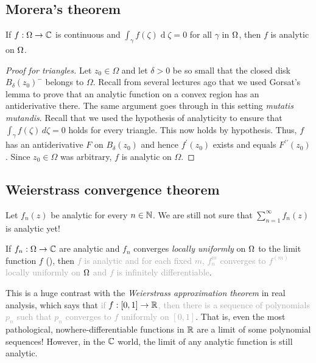 \documentclass[12pt]{article}
\renewcommand{\d}{\ensuremath{\operatorname{d}}}
\begin{document}
\subsection{Morera's theorem}
\begin{theorem}[Morera]
    If $f:\Omega\to\mathbb{C}$ is continuous and $\int_{\gamma}f(\zeta)\d\zeta=0$ for all \underline{\hspace{2cm}} $\gamma$ in $\Omega$, then $f$ is analytic on $\Omega$. 
\end{theorem}
\begin{proof}[Proof for triangles]
    Let $z_{0}\in\Omega$ and let $\delta>0$ be so small that the closed disk $B_{\delta}(z_{0})^{-}$ belongs to $\Omega$. Recall from several lectures ago that we used Gorsat's lemma to prove that an analytic function on a convex region has an antiderivative there. The same argument goes through in this setting \textit{mutatis mutandis}. Recall that we used the hypothesis of analyticity to ensure that $\int_{\gamma}f(\zeta)\,d\zeta=0$ holds for every triangle. This now holds by hypothesis. Thus, $f$ has an antiderivative $F$ on $B_{\delta}(z_{0})$ and hence $f^{\prime}(z_{0})$ exists and equals $F^{\prime\prime}(z_{0})$. Since $z_{0}\in\Omega$ was arbitrary, $f$ is analytic on $\Omega$.
\end{proof}

\subsection{Weierstrass convergence theorem}
Let $f_n(z)$ be analytic for every $n\in \mathbb{N}$. We are still not sure that $\sum_{n=1}^{\infty} f_n(z)$ is analytic yet!

\begin{theorem}
    If $f_n:\Omega\to \mathbb{C}$ are analytic and $f_n$ converges \textit{locally uniformly} on $\Omega$ to the limit function $f$ (), then \textcolor{darkgray}{$f$ is analytic and for each fixed $m$, $f_n^{m}$ converges to $f^{(m)}$ locally uniformly on $\Omega$ and $f$ is infinitely differentiable}. 
\end{theorem}

\rmk This is a huge contrast with the\textit{ Weierstrass approximation theorem} in real analysis, which says that \textcolor{darkgray}{if $f:[0,1]\to \mathbb{R}$, then there is a sequence of polynomials $p_n$ such that $p_n$ converges to $f$ uniformly on $[0,1]$}. That is, even the most pathological, nowhere-differentiable functions in $\mathbb{R}$ are a limit of some polynomial sequences! However, in the $\mathbb{C}$ world, the limit of any analytic function is still analytic.
\end{document}
